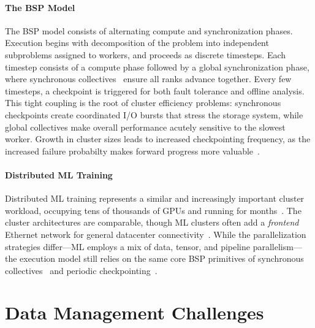 \paragraph{The BSP Model}
The BSP model consists of alternating compute and synchronization phases.
Execution begins with decomposition of the problem into independent subproblems assigned to
workers, and proceeds as discrete timesteps.
Each timestep consists of a compute phase followed by a global synchronization phase, where
synchronous collectives~\cite{:MPI, :NCCL} ensure all ranks advance together.
Every few timesteps, a checkpoint is triggered for both fault tolerance and offline analysis.
This tight coupling is the root of cluster efficiency problems: synchronous checkpoints create
coordinated I/O bursts that stress the storage system, while global collectives make overall
performance acutely sensitive to the slowest worker.
Growth in cluster sizes leads to increased checkpointing frequency, as the increased failure
probabilty makes forward progress more valuable~\cite{Jones2012:Checkpointing}.


\paragraph{Distributed ML Training}
Distributed ML training represents a similar and increasingly important cluster workload, occupying
tens of thousands of GPUs and running for
months~\cite{:LlamaScale,Rahma2024:MLScale,Gratt2024:Llama3Scale}.
The cluster architectures are comparable, though ML clusters often add a \emph{frontend} Ethernet
network for general datacenter connectivity~\cite{Gangi2024:RDMA}.
While the parallelization strategies differ---ML employs a mix of data, tensor, and pipeline
parallelism---the execution model still relies on the same core BSP primitives of synchronous
collectives~\cite{Gangi2024:RDMA} and periodic checkpointing~\cite{Eisen2022:Checkpoint}.

\section{Data Management Challenges}
\label{sec:bg:data}

